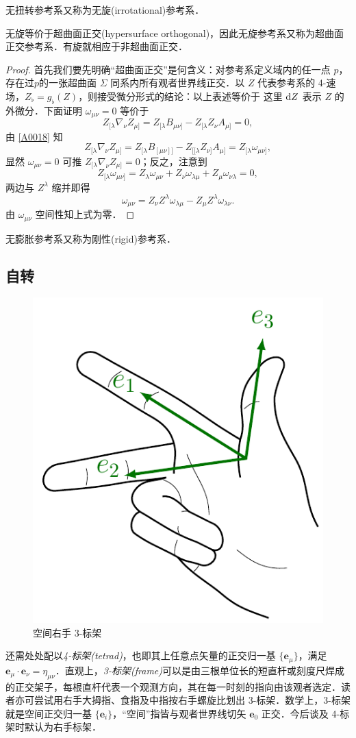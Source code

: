 \begin{definition}
    无扭转参考系又称为无旋(irrotational)参考系．
\end{definition}
\begin{theorem}
    无旋等价于超曲面正交(hypersurface orthogonal)，因此无旋参考系又称为超曲面正交参考系．有旋就相应于非超曲面正交．
\end{theorem}
\begin{proof}
    首先我们要先明确“超曲面正交”是何含义：对参考系定义域内的任一点 $p$，存在过$p$的一张超曲面 $\Sigma$ 同系内所有观者世界线正交．以 $Z$ 代表参考系的 4-速场，$Z_\flat=g_\flat(Z)$，则接受微分形式的结论：以上表述等价于
    这里 $\dd Z$ 表示 $Z$ 的外微分．下面证明 $\omega_{\mu\nu}=0$ 等价于 \[Z_{[\lambda}\nabla_\nu Z_{\mu]}=Z_{[\lambda}B_{\mu\nu]}-Z_{[\lambda} Z_\nu A_{\mu]}=0,\]
    由 \ref{A0018} 知
    \[Z_{[\lambda}\nabla_\nu Z_{\mu]}=Z_{[\lambda}B_{[\mu\nu]]}-Z_{[[\lambda} Z_{\nu]} A_{\mu]}=Z_{[\lambda}\omega_{\mu\nu]},\]
    显然 $\omega_{\mu\nu}=0$ 可推 $Z_{[\lambda}\nabla_\nu Z_{\mu]}=0$；反之，注意到
    \[
    Z_{[\lambda}\omega_{\mu\nu]}=Z_\lambda\omega_{\mu\nu}+Z_\nu\omega_{\lambda\mu}+Z_\mu\omega_{\nu\lambda}=0,
    \]
    两边与 $Z^\lambda$ 缩并即得
    \[
    \omega_{\mu\nu}=Z_\nu Z^\lambda\omega_{\lambda\mu}-Z_\mu Z^\lambda\omega_{\lambda\nu}.
    \]
    由 $\omega_{\mu\nu}$ 空间性知上式为零．
\end{proof}

\begin{definition}
    无膨胀参考系又称为刚性(rigid)参考系．
\end{definition}

 

\subsection{自转}



\begin{figure}
    \includegraphics[width=.3\textwidth]{fig/chpt01/tetrad hand.pdf}
    \caption{空间右手 3-标架}
\end{figure}
还需处处配以\textit{4-标架(tetrad)}，也即其上任意点矢量的正交归一基 $\{\bm{e}_\mu\}$，满足 $\bm{e}_\mu\cdot\bm{e}_\nu=\eta_{\mu\nu}$．直观上，\textit{3-标架(frame)}可以是由三根单位长的短直杆或刻度尺焊成的正交架子，每根直杆代表一个观测方向，其在每一时刻的指向由该观者选定．读者亦可尝试用右手大拇指、食指及中指按右手螺旋比划出 3-标架．数学上，3-标架就是空间正交归一基 $\{\bm{e}_i\}$，“空间”指皆与观者世界线切矢 $\bm{e}_0$ 正交．今后谈及 4-标架时默认为右手标架．



